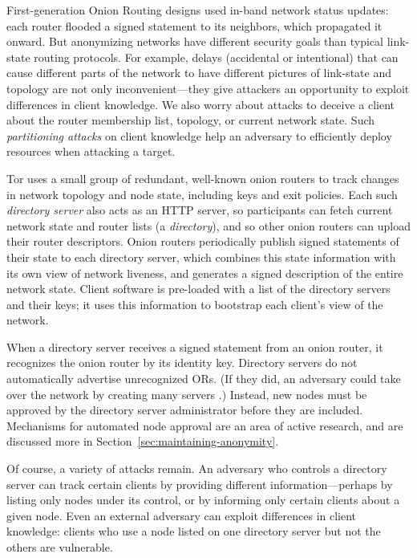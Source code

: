 \documentclass[times,10pt,twocolumn]{article}
\begin{document}
\label{subsec:dirservers}

First-generation Onion Routing designs \cite{freedom2-arch,or-jsac98} used
in-band network status updates: each router flooded a signed statement
to its neighbors, which propagated it onward. But anonymizing networks
have different security goals than typical link-state routing protocols.
For example, delays (accidental or intentional)
that can cause different parts of the network to have different pictures
of link-state and topology are not only inconvenient---they give
attackers an opportunity to exploit differences in client knowledge.
We also worry about attacks to deceive a
client about the router membership list, topology, or current network
state. Such \emph{partitioning attacks} on client knowledge help an
adversary to efficiently deploy resources
when attacking a target.

Tor uses a small group of redundant, well-known onion routers to
track changes in network topology and node state, including keys and
exit policies.  Each such \emph{directory server} also acts as an HTTP
server, so participants can fetch current network state and router
lists (a \emph{directory}), and so other onion routers can upload
their router descriptors.  Onion routers periodically publish signed
statements of their state to each directory server, which combines this
state information with its own view of network liveness, and generates
a signed description of the entire network state. Client software is
pre-loaded with a list of the directory servers and their keys; it uses
this information to bootstrap each client's view of the network.

When a directory server receives a signed statement from an onion
router, it recognizes the onion router by its identity key. Directory
servers do not automatically advertise unrecognized ORs. (If they did,
an adversary could take over the network by creating many servers
\cite{sybil}.) Instead, new nodes must be approved by the directory
server administrator before they are included. Mechanisms for automated
node approval are an area of active research, and are discussed more
in Section~\ref{sec:maintaining-anonymity}.
  
Of course, a variety of attacks remain. An adversary who controls
a directory server can track certain clients by providing different
information---perhaps by listing only nodes under its control, or by
informing only certain clients about a given node. Even an external
adversary can exploit differences in client knowledge: clients who use
a node listed on one directory server but not the others are vulnerable.
\end{document}
